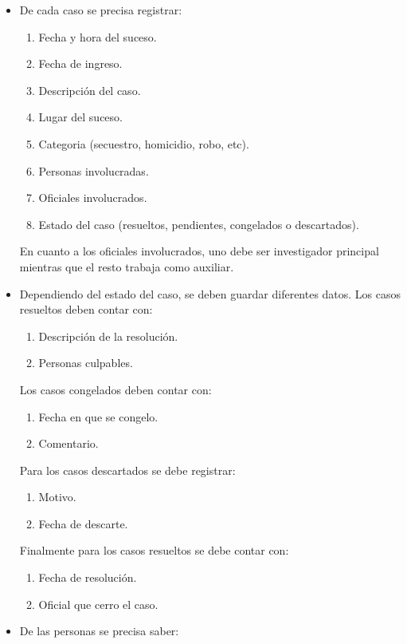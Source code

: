 \documentclass{article}
\theoremstyle{definition}
\theoremstyle{remark}
\begin{document}
\begin{itemize}
    \item De cada caso se precisa registrar:
        \begin{enumerate}
            \item Fecha y hora del suceso.
            \item Fecha de ingreso.
            \item Descripción del caso.
            \item Lugar del suceso.
            \item Categoria (secuestro, homicidio, robo, etc).
            \item Personas involucradas.
            \item Oficiales involucrados.
            \item Estado del caso (resueltos, pendientes, congelados o descartados).
        \end{enumerate}
        En cuanto a los oficiales involucrados, uno debe ser investigador principal mientras que el resto trabaja como auxiliar.
    \item Dependiendo del estado del caso, se deben guardar diferentes datos. Los casos resueltos deben contar con:
        \begin{enumerate}
            \item Descripción de la resolución.
            \item Personas culpables.
        \end{enumerate}
    Los casos congelados deben contar con:
        \begin{enumerate}
            \item Fecha en que se congelo.
            \item Comentario.
        \end{enumerate}
    Para los casos descartados se debe registrar:
        \begin{enumerate}
            \item Motivo.
            \item Fecha de descarte.
        \end{enumerate}
    Finalmente para los casos resueltos se debe contar con:
        \begin{enumerate}
            \item Fecha de resolución.
            \item Oficial que cerro el caso.
        \end{enumerate}
    \pagebreak
    \item De las personas se precisa saber:

\end{itemize}
\end{document}
